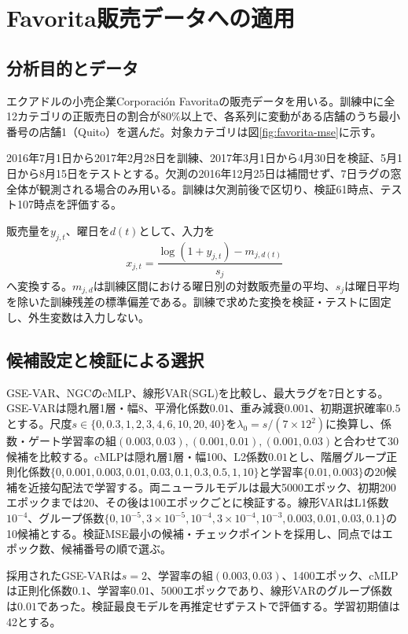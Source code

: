 \section{Favorita販売データへの適用}
\label{sec:application}
\subsection{分析目的とデータ}
エクアドルの小売企業Corporación Favoritaの販売データ\citep{favoritadata}を用いる。訓練中に全12カテゴリの正販売日の割合が\(80\%\)以上で、各系列に変動がある店舗のうち最小番号の店舗1（Quito）を選んだ。対象カテゴリは図\ref{fig:favorita-mse}に示す。

2016年7月1日から2017年2月28日を訓練、2017年3月1日から4月30日を検証、5月1日から8月15日をテストとする。欠測の2016年12月25日は補間せず、7日ラグの窓全体が観測される場合のみ用いる。訓練は欠測前後で区切り、検証61時点、テスト107時点を評価する。

販売量を\(y_{j,t}\)、曜日を\(d(t)\)として、入力を
\begin{equation}
 x_{j,t}=\frac{\log(1+y_{j,t})-m_{j,d(t)}}{s_j}
 \label{eq:favorita-transform}
\end{equation}
へ変換する。\(m_{j,d}\)は訓練区間における曜日別の対数販売量の平均、\(s_j\)は曜日平均を除いた訓練残差の標準偏差である。訓練で求めた変換を検証・テストに固定し、外生変数は入力しない。

\subsection{候補設定と検証による選択}
GSE-VAR、NGCのcMLP\citep{tank2022}、線形VAR(SGL)を比較し、最大ラグを7日とする。GSE-VARは隠れ層1層・幅8、平滑化係数\(0.01\)、重み減衰\(0.001\)、初期選択確率\(0.5\)とする。尺度\(s\in\{0,0.3,1,2,3,4,6,10,20,40\}\)を\(\lambda_0=s/(7\times12^2)\)に換算し、係数・ゲート学習率の組\((0.003,0.03),(0.001,0.01),(0.001,0.03)\)と合わせて30候補を比較する。cMLPは隠れ層1層・幅100、L2係数\(0.01\)とし、階層グループ正則化係数\(\{0,0.001,0.003,0.01,0.03,0.1,0.3,0.5,1,10\}\)と学習率\(\{0.01,0.003\}\)の20候補を近接勾配法で学習する。両ニューラルモデルは最大5000エポック、初期200エポックまでは20、その後は100エポックごとに検証する。線形VARはL1係数\(10^{-4}\)、グループ係数\(\{0,10^{-5},3\times10^{-5},10^{-4},3\times10^{-4},10^{-3},0.003,0.01,0.03,0.1\}\)の10候補とする。検証MSE最小の候補・チェックポイントを採用し、同点ではエポック数、候補番号の順で選ぶ。

採用されたGSE-VARは\(s=2\)、学習率の組\((0.003,0.03)\)、1400エポック、cMLPは正則化係数\(0.1\)、学習率\(0.01\)、5000エポックであり、線形VARのグループ係数は\(0.01\)であった。検証最良モデルを再推定せずテストで評価する。学習初期値は42とする。

